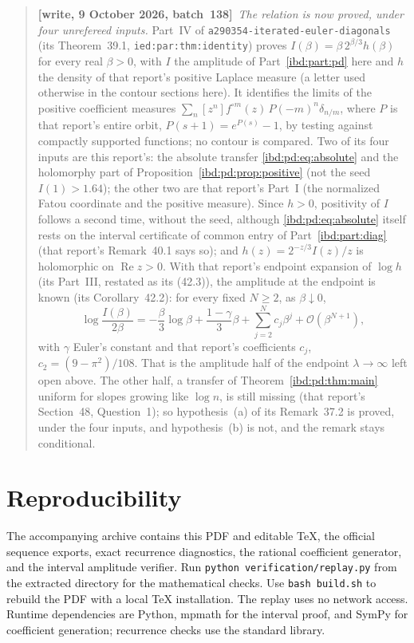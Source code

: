 \documentclass[11pt,letterpaper]{article}
\theoremstyle{remark}\newtheorem{remark}[theorem]{Remark}
\newcommand{\Oh}{\mathcal O}
\DeclareMathOperator{\Rea}{Re}
\newcommand{\repopath}[1]{\nolinkurl{#1}}
\begin{document}
\par\smallskip\begin{quote}\small\textbf{[write, 9 October 2026, batch~138]}\ \emph{The relation is now proved, under four unrefereed inputs.} Part~IV of \repopath{a290354-iterated-euler-diagonals} (its Theorem~39.1, \texttt{ied:par:thm:identity}) proves $I(\beta)=\beta\,2^{\beta/3}h(\beta)$ for every real $\beta>0$, with $I$ the amplitude of Part~\ref{ibd:part:pd} here and $h$ the density of that report's positive Laplace measure (a letter used otherwise in the contour sections here). It identifies the limits of the positive coefficient measures $\sum_n[z^n]f^{\circ m}(z)\,P(-m)^n\delta_{n/m}$, where $P$ is that report's entire orbit, $P(s+1)=e^{P(s)}-1$, by testing against compactly supported functions; no contour is compared. Two of its four inputs are this report's: the absolute transfer \eqref{ibd:pd:eq:absolute} and the holomorphy part of Proposition~\ref{ibd:pd:prop:positive} (not the seed $I(1)>1.64$); the other two are that report's Part~I (the normalized Fatou coordinate and the positive measure). Since $h>0$, positivity of $I$ follows a second time, without the seed, although \eqref{ibd:pd:eq:absolute} itself rests on the interval certificate of common entry of Part~\ref{ibd:part:diag} (that report's Remark~40.1 says so); and $h(z)=2^{-z/3}I(z)/z$ is holomorphic on $\Rea z>0$. With that report's endpoint expansion of $\log h$ (its Part~III, restated as its (42.3)), the amplitude at the endpoint is known (its Corollary~42.2): for every fixed $N\ge2$, as $\beta\downarrow0$,
\[
 \log\frac{I(\beta)}{2\beta}=-\frac\beta3\log\beta+\frac{1-\gamma}3\beta+\sum_{j=2}^Nc_j\beta^j+\Oh(\beta^{N+1}),
\]
with $\gamma$ Euler's constant and that report's coefficients $c_j$, $c_2=(9-\pi^2)/108$. That is the amplitude half of the endpoint $\lambda\to\infty$ left open above. The other half, a transfer of Theorem~\ref{ibd:pd:thm:main} uniform for slopes growing like $\log n$, is still missing (that report's Section~48, Question~1); so hypothesis~(a) of its Remark~37.2 is proved, under the four inputs, and hypothesis~(b) is not, and the remark stays conditional.\end{quote}\smallskip

\section{Reproducibility}\label{ibd:sec:repro}
The accompanying archive contains this PDF and editable TeX, the official sequence exports, exact recurrence diagnostics, the rational coefficient generator, and the interval amplitude verifier. Run \texttt{python verification/replay.py} from the extracted directory for the mathematical checks. Use \texttt{bash build.sh} to rebuild the PDF with a local TeX installation. The replay uses no network access. Runtime dependencies are Python, mpmath for the interval proof, and SymPy for coefficient generation; recurrence checks use the standard library.
\end{document}
